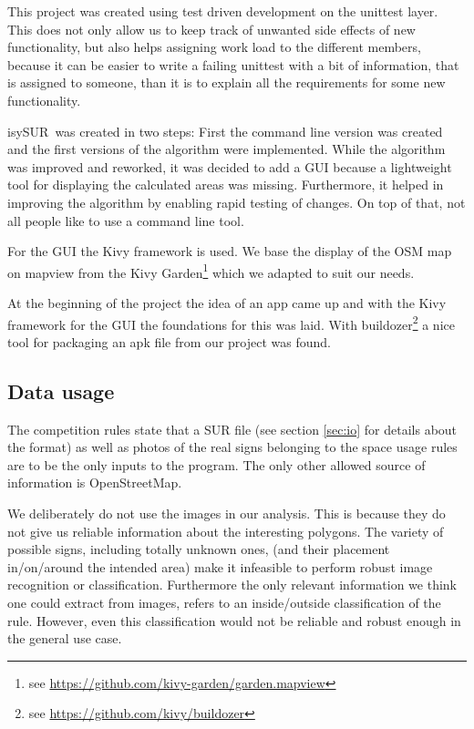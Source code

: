 \documentclass[11pt,fleqn]{book} %
\newcommand{\ProjectTitle}{isySUR}
\newcommand{\pt}{\ProjectTitle}
\begin{document}
This project was created using test driven development on the unittest layer. This does not only allow us to keep track of unwanted side effects of new functionality, but also helps assigning work load to the different members, because it can be easier to write a failing unittest with a bit of information, that is assigned to someone, than it is to explain all the requirements for some new functionality.

\pt\ was created in two steps: First the command line version was created and the first versions of the algorithm were implemented. While the algorithm was improved and reworked, it was decided to add a GUI because a lightweight tool for displaying the calculated areas was missing. Furthermore, it helped in improving the algorithm by enabling rapid testing of changes. On top of that, not all people like to use a command line tool.

For the GUI the Kivy framework is used. We base the display of the OSM map on mapview from the Kivy Garden\footnote{see \url{https://github.com/kivy-garden/garden.mapview}} which we adapted to suit our needs.

At the beginning of the project the idea of an app came up and with the Kivy framework for the GUI the foundations for this was laid. With buildozer\footnote{see \url{https://github.com/kivy/buildozer}} a nice tool for packaging an apk file from our project was found.

\subsection{Data usage}\label{sec:data_usage}
The competition rules state that a SUR file (see section \ref{sec:io} for details about the format) as well as photos of the real signs belonging to the space usage rules are to be the only inputs to the program. The only other allowed source of information is OpenStreetMap. 

We deliberately do not use the images in our analysis. This is because they do not give us reliable information about the interesting polygons. The variety of possible signs, including totally unknown ones, (and their placement in/on/around the intended area) make it infeasible to perform robust image recognition or classification. Furthermore the only relevant information we think one could extract from images, refers to an inside/outside classification of the rule. However, even this classification would not be reliable and robust enough in the general use case.
\end{document}
